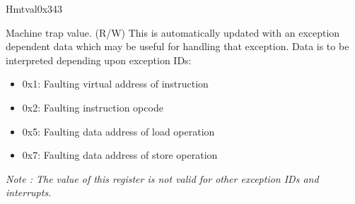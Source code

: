 \begin{register}{H}{mtval}{0x343}\label{regdesc:MTVAL}
%
\regnewline%
\begin{regdesc}\begin{reglist}
\label{fielddesc:MTVAL}\item [MTVAL] Machine trap value. (R/W) \newline This is automatically updated with an exception dependent data which may be useful for handling that exception.
\newline Data is to be interpreted depending upon exception IDs:
\begin{itemize}
    \setlength\itemsep{-1em}
    \item 0x1: Faulting virtual address of instruction
    \item 0x2: Faulting instruction opcode
    \item 0x5: Faulting data address of load operation
    \item 0x7: Faulting data address of store operation
\end{itemize}
\textit {Note : The value of this register is not valid for  other exception IDs and interrupts.}
\end{reglist}\end{regdesc}
\end{register}

